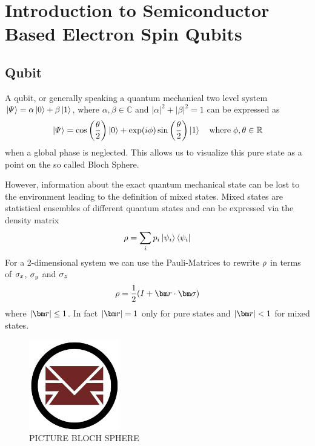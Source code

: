 \chapter{Introduction to Semiconductor Based Electron Spin Qubits}
\label{chap:motivation}
\section{Qubit}
A qubit, or generally speaking a quantum mechanical two level system 
$ \ket{\Psi} = \alpha \ket{0} + \beta \ket{1} $, where $\alpha, \beta \in \mathbb{C}$ and $|\alpha|^2 + |\beta|^2=1$ can be expressed as
\begin{equation}
    \ket{\Psi}=\cos \left( \frac{\theta}{2} \right) \ket{0} + \exp(i \phi) \sin \left( \frac{\theta}{2} \right) \ket{1} \quad \text{where}\;  \phi, \theta \in \mathbb{R}
\end{equation}
when a global phase is neglected. This allows us to visualize this pure state as a point on the so called Bloch Sphere.

However, information about the exact quantum mechanical state can be lost to the environment leading to the definition of mixed states.  Mixed states are statistical ensembles of different quantum states and can be expressed via the density matrix 
\begin{equation}
    \rho = \sum_i p_i \ket{\psi_i}\bra{\psi_i}
\end{equation}
For a 2-dimensional system we can use the Pauli-Matrices to rewrite $\rho$ in terms of $\sigma_x$, $\sigma_y$ and $\sigma_z$
\begin{equation}
    \dm= \frac{1}{2}(\eye+\vsym{r} \cdot \vecsig)
\end{equation}
where $|\vsym{r}|\le 1$. In fact $|\vsym{r}|= 1$ only for pure states and $|\vsym{r}|< 1$ for mixed states. \cite{Feynman1957}

 \begin{figure}[htbp]\centering
     \centering
     \includegraphics[width=0.35\textwidth]{./pictures/dummy}
     \caption{PICTURE BLOCH SPHERE}
     \label{fig:bloch_sphere}
 \end{figure}

